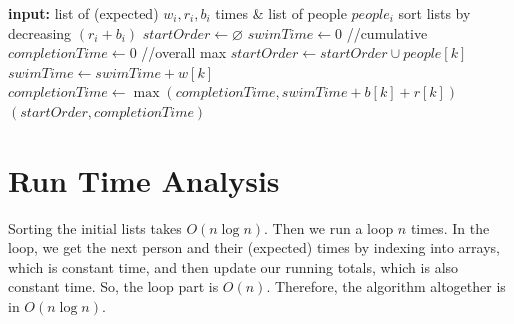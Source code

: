 \documentclass[a4paper,11pt]{article}
\begin{document}
\begin{algorithm}[H]
\caption{Compute optimal completion time}
\label{alg:optimal_completion}
\begin{algorithmic}[1]
    \State \textbf{input:} list of (expected) $w_i, r_i, b_i$ times \& list of people $people_i$
    \State sort lists by decreasing $(r_i + b_i)$
    \State $startOrder \gets \varnothing$
    \State $swimTime \gets 0$ //cumulative
    \State $completionTime \gets 0$ //overall max
        \State $startOrder \gets startOrder \cup people[k]$
        \State $swimTime \gets swimTime + w[k]$
        \State $completionTime \gets \max(completionTime, swimTime+b[k]+r[k])$
    \EndFor
    \State \Return $(startOrder, completionTime)$
\end{algorithmic}
\end{algorithm}

\section{Run Time Analysis}
Sorting the initial lists takes $O(n\log n)$. Then we run a loop $n$ times. In the loop, we get the next person and their (expected) times by indexing into arrays, which is constant time, and then update our running totals, which is also constant time. So, the loop part is $O(n)$. Therefore, the algorithm altogether is in $O(n\log n)$.
\end{document}
